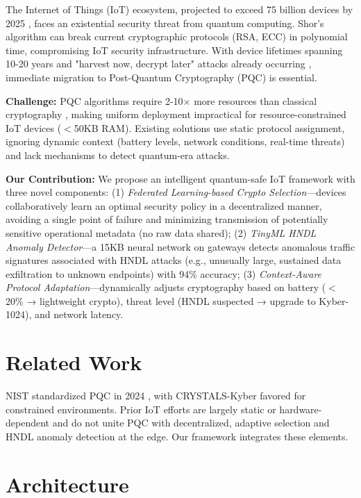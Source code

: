 \documentclass[conference]{IEEEtran}
\begin{document}
The Internet of Things (IoT) ecosystem, projected to exceed 75 billion devices by 2025 \cite{statista2024}, faces an existential security threat from quantum computing. Shor's algorithm \cite{shor1994} can break current cryptographic protocols (RSA, ECC) in polynomial time, compromising IoT security infrastructure. With device lifetimes spanning 10-20 years and "harvest now, decrypt later" attacks already occurring \cite{mosca2018}, immediate migration to Post-Quantum Cryptography (PQC) is essential.

\textbf{Challenge:} PQC algorithms require 2-10$\times$ more resources than classical cryptography \cite{nist2024pqc}, making uniform deployment impractical for resource-constrained IoT devices ($<$50KB RAM). Existing solutions use static protocol assignment, ignoring dynamic context (battery levels, network conditions, real-time threats) and lack mechanisms to detect quantum-era attacks.

\textbf{Our Contribution:} We propose an intelligent quantum-safe IoT framework with three novel components: (1) \textit{Federated Learning-based Crypto Selection}—devices collaboratively learn an optimal security policy in a decentralized manner, avoiding a single point of failure and minimizing transmission of potentially sensitive operational metadata (no raw data shared); (2) \textit{TinyML HNDL Anomaly Detector}—a 15KB neural network on gateways detects anomalous traffic signatures associated with HNDL attacks (e.g., unusually large, sustained data exfiltration to unknown endpoints) with 94\% accuracy; (3) \textit{Context-Aware Protocol Adaptation}—dynamically adjusts cryptography based on battery ($<$20\% → lightweight crypto), threat level (HNDL suspected → upgrade to Kyber-1024), and network latency.

\section{Related Work}

NIST standardized PQC in 2024 \cite{nist2024pqc}, with CRYSTALS-Kyber favored for constrained environments. Prior IoT efforts are largely static or hardware-dependent and do not unite PQC with decentralized, adaptive selection and HNDL anomaly detection at the edge. Our framework integrates these elements.

\section{Architecture}
\end{document}
